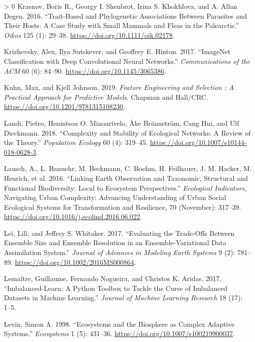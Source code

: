 \documentclass[10pt,oneside]{article}
\newlength{\cslhangindent}
\newenvironment{CSLReferences}[3] %
 {%
  \setlength{\parindent}{0pt}
  \ifodd #1 \everypar{\setlength{\hangindent}{\cslhangindent}}\ignorespaces\fi
  \ifnum #2 > 0
  \setlength{\parskip}{#2\baselineskip}
  \fi
 }%
 {}
\begin{document}
\begin{CSLReferences}{1}{0}
\leavevmode\hypertarget{ref-Krasnov2016TraPhy}{}%
Krasnov, Boris R., Georgy I. Shenbrot, Irina S. Khokhlova, and A. Allan
Degen. 2016. {``Trait-Based and Phylogenetic Associations Between
Parasites and Their Hosts: A Case Study with Small Mammals and Fleas in
the Palearctic.''} \emph{Oikos} 125 (1): 29--38.
\url{https://doi.org/10.1111/oik.02178}.

\leavevmode\hypertarget{ref-Krizhevsky2017ImaCla}{}%
Krizhevsky, Alex, Ilya Sutskever, and Geoffrey E. Hinton. 2017.
{``ImageNet Classification with Deep Convolutional Neural Networks.''}
\emph{Communications of the ACM} 60 (6): 84--90.
\url{https://doi.org/10.1145/3065386}.

\leavevmode\hypertarget{ref-Kuhn2019FeaEng}{}%
Kuhn, Max, and Kjell Johnson. 2019. \emph{Feature Engineering and
Selection : A Practical Approach for Predictive Models}. Chapman and
Hall/CRC. \url{https://doi.org/10.1201/9781315108230}.

\leavevmode\hypertarget{ref-Landi2018ComSta}{}%
Landi, Pietro, Henintsoa O. Minoarivelo, Åke Brännström, Cang Hui, and
Ulf Dieckmann. 2018. {``Complexity and Stability of Ecological Networks:
A Review of the Theory.''} \emph{Population Ecology} 60 (4): 319--45.
\url{https://doi.org/10.1007/s10144-018-0628-3}.

\leavevmode\hypertarget{ref-Lausch2016LinEar}{}%
Lausch, A., L. Bannehr, M. Beckmann, C. Boehm, H. Feilhauer, J. M.
Hacker, M. Heurich, et al. 2016. {``Linking Earth Observation and
Taxonomic, Structural and Functional Biodiversity: Local to Ecosystem
Perspectives.''} \emph{Ecological Indicators}, Navigating Urban
Complexity: Advancing Understanding of Urban Social Ecological Systems
for Transformation and Resilience, 70 (November): 317--39.
\url{https://doi.org/10.1016/j.ecolind.2016.06.022}.

\leavevmode\hypertarget{ref-Lei2017EvaTra}{}%
Lei, Lili, and Jeffrey S. Whitaker. 2017. {``Evaluating the Trade-Offs
Between Ensemble Size and Ensemble Resolution in an Ensemble-Variational
Data Assimilation System.''} \emph{Journal of Advances in Modeling Earth
Systems} 9 (2): 781--89. \url{https://doi.org/10.1002/2016MS000864}.

\leavevmode\hypertarget{ref-Lemaitre2017ImbPyt}{}%
Lemaître, Guillaume, Fernando Nogueira, and Christos K. Aridas. 2017.
{``Imbalanced-Learn: A Python Toolbox to Tackle the Curse of Imbalanced
Datasets in Machine Learning.''} \emph{Journal of Machine Learning
Research} 18 (17): 1--5.

\leavevmode\hypertarget{ref-Levin1998EcoBio}{}%
Levin, Simon A. 1998. {``Ecosystems and the Biosphere as Complex
Adaptive Systems.''} \emph{Ecosystems} 1 (5): 431--36.
\url{https://doi.org/10.1007/s100219900037}.


\end{CSLReferences}
\end{document}
